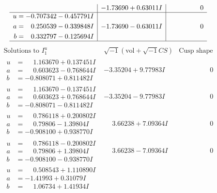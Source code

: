 \documentclass[1p]{elsarticle_modified}
\theoremstyle{definition}
\newcommand{\I}{\sqrt{-1}}
\begin{document}
$$\begin{array}{c|c|c}
 & -1.73690 + 0.63011 I & \phantom{-0.000000 } 0 \\ \hline\begin{aligned}
u &= -0.707342 - 0.457791 I \\
a &= \phantom{-}0.250539 - 0.339848 I \\
b &= \phantom{-}0.332797 - 0.125694 I\end{aligned}
 & -1.73690 - 0.63011 I & \phantom{-0.000000 } 0\\
 \hline 
 \end{array}$$\newpage$$\begin{array}{c|c|c}  
\text{Solutions to }I^u_{1}& \I (\text{vol} + \sqrt{-1}CS) & \text{Cusp shape}\\
 \hline 
\begin{aligned}
u &= \phantom{-}1.163670 + 0.137451 I \\
a &= \phantom{-}0.603623 - 0.768644 I \\
b &= -0.808071 + 0.811482 I\end{aligned}
 & -3.35204 + 9.77983 I & \phantom{-0.000000 } 0 \\ \hline\begin{aligned}
u &= \phantom{-}1.163670 - 0.137451 I \\
a &= \phantom{-}0.603623 + 0.768644 I \\
b &= -0.808071 - 0.811482 I\end{aligned}
 & -3.35204 - 9.77983 I & \phantom{-0.000000 } 0 \\ \hline\begin{aligned}
u &= \phantom{-}0.786118 + 0.200802 I \\
a &= \phantom{-}0.79806 - 1.39804 I \\
b &= -0.908100 + 0.938770 I\end{aligned}
 & \phantom{-}3.66238 + 7.09364 I & \phantom{-0.000000 } 0 \\ \hline\begin{aligned}
u &= \phantom{-}0.786118 - 0.200802 I \\
a &= \phantom{-}0.79806 + 1.39804 I \\
b &= -0.908100 - 0.938770 I\end{aligned}
 & \phantom{-}3.66238 - 7.09364 I & \phantom{-0.000000 } 0 \\ \hline\begin{aligned}
u &= \phantom{-}0.508543 + 1.110890 I \\
a &= -1.41993 + 0.31079 I \\
b &= \phantom{-}1.06734 + 1.41934 I\end{aligned}

\end{array}$$
\end{document}
